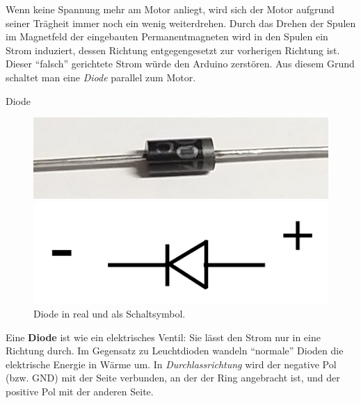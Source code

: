 Wenn keine Spannung mehr am Motor anliegt, wird sich der Motor aufgrund seiner Trägheit immer noch ein wenig weiterdrehen. Durch das Drehen der Spulen im Magnetfeld der eingebauten Permanentmagneten wird in den Spulen ein Strom induziert, dessen Richtung entgegengesetzt zur vorherigen Richtung ist. Dieser \enquote{falsch} gerichtete Strom würde den Arduino zerstören. Aus diesem Grund schaltet man eine \emph{Diode} parallel zum Motor.

\begin{zsfg}{Diode}
	\begin{figure}
		\vspace{-0.5\baselineskip}
		\centering
		\includegraphics[width=0.75\linewidth]{./pics/diode2.jpg}
		
		\vspace{-0.5\baselineskip}
		\includegraphics[width=0.75\linewidth,angle=180]{./Zeichnungen/diode-schaltsym.png}
		\caption{Diode in real und als Schaltsymbol.}
	\end{figure}
	Eine \textbf{Diode} ist wie ein elektrisches Ventil: Sie lässt den Strom nur in eine Richtung durch. Im Gegensatz zu Leuchtdioden wandeln \enquote{normale} Dioden die elektrische Energie in Wärme um. In \emph{Durchlassrichtung} wird der negative Pol (bzw. GND) mit der Seite verbunden, an der der Ring angebracht ist, und der positive Pol mit der anderen Seite.
	\bigskip
\end{zsfg}

%		


